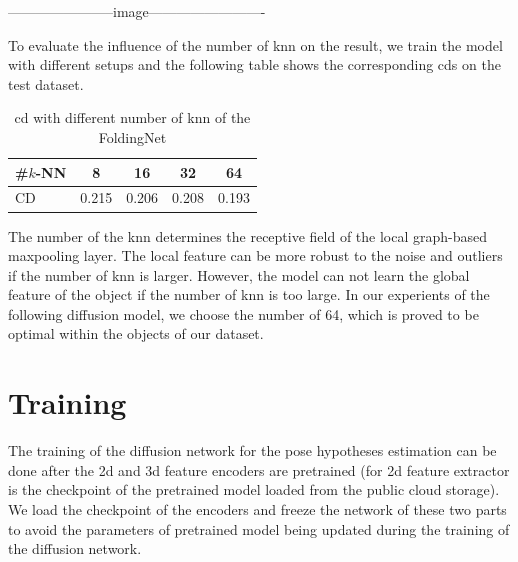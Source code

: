 \documentclass[12pt,DIV14,BCOR12mm,a4paper,footinclude=false,headinclude,parskip=half-,twoside,openright,cleardoublepage=empty,toc=index,bibliography=totoc,listof=totoc]{scrreprt}
\numberwithin{equation}{chapter}
\begin{document}
-----------------------image-------------------------

To evaluate the influence of the number of \gls{knn} on the result, we train the model with different setups and the following table shows the corresponding \glspl{cd} on the test dataset.
\begin{table}[h]
  \centering
  \caption{\gls{cd} with different number of \gls{knn} of the FoldingNet}
  \label{tab:fold_knn}
  \begin{tabular}{l | c c c c}
    \toprule
    \#$k$-NN & 8 & 16 & 32 & 64\\
    \midrule
    CD & 0.215 & 0.206 & 0.208 & 0.193\\
    \bottomrule
  \end{tabular}
\end{table}

The number of the \gls{knn} determines the receptive field of the local graph-based maxpooling layer. The local feature can be more robust to the noise and outliers if the number of \gls{knn} is larger. However, the model can not learn the global feature of the object if the number of \gls{knn} is too large. In our experients of the following diffusion model, we choose the number of 64, which is proved to be optimal within the objects of our dataset.

\section{Training} 
The training of the diffusion network for the pose hypotheses estimation can be done after the \gls{2d} and \gls{3d} feature encoders are pretrained (for \gls{2d} feature extractor is the checkpoint of the pretrained model loaded from the public cloud storage). We load the checkpoint of the encoders and freeze the network of these two parts to avoid the parameters of pretrained model being updated during the training of the diffusion network. 
\end{document}
